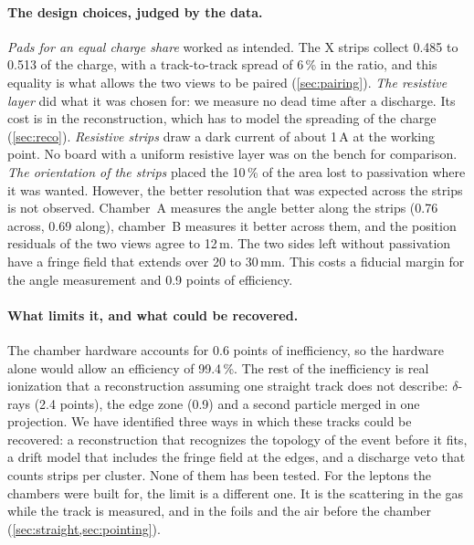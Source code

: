 \paragraph{The design choices, judged by the data.} \emph{Pads for an equal charge share} worked as intended. The X strips
collect 0.485 to 0.513 of the charge, with a track-to-track spread of 6\,\% in the ratio, and this equality is what
allows the two views to be paired (\cref{sec:pairing}). \emph{The resistive layer} did what it was chosen for: we
measure no dead time after a discharge. Its cost is in the reconstruction, which has to model the spreading of the
charge (\cref{sec:reco}). \emph{Resistive strips} draw a dark current of about 1\,\textmu A at the working point. No
board with a uniform resistive layer was on the bench for comparison. \emph{The orientation of the strips} placed the
10\,\% of the area lost to passivation where it was wanted. However, the better resolution that was expected across the
strips is not observed. Chamber~A measures the angle better along the strips (0.76\textdegree{} across,
0.69\textdegree{} along), chamber~B measures it better across them, and the position residuals of the two views agree
to 12\,\textmu m. The two sides left without passivation have a fringe field that extends over 20 to 30\,mm. This
costs a fiducial margin for the angle measurement and 0.9 points of efficiency.

\paragraph{What limits it, and what could be recovered.} The chamber hardware accounts for 0.6 points of
inefficiency, so the hardware alone would allow an efficiency of 99.4\,\%. The rest of the inefficiency is real
ionization that a reconstruction assuming one straight track does not describe: $\delta$-rays (2.4 points), the edge
zone (0.9) and a second particle merged in one projection. We have identified three ways in which these tracks could
be recovered: a reconstruction that recognizes the topology of the event before it fits, a drift model that includes
the fringe field at the edges, and a discharge veto that counts strips per cluster. None of them has been tested. For
the leptons the chambers were built for, the limit is a different one. It is the scattering in the gas while the track
is measured, and in the foils and the air before the chamber (\cref{sec:straight,sec:pointing}).


